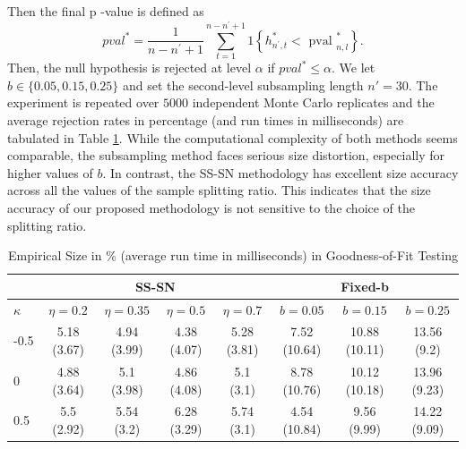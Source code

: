 \documentclass[11pt]{article}
\theoremstyle{plain}
\theoremstyle{definition}
\theoremstyle{remark}
\begin{document}
Then the final p -value is defined as
$$
pval^*=\frac{1}{n-n^{\prime}+1} \sum_{t=1}^{n-n^{\prime}+1} 1\left\{h_{n^{\prime}, t}^*<\text { pval }_{n, l}^*\right\}.
$$
 Then, the null hypothesis is rejected at level $\alpha$ if $pval^*\leq \alpha.$ We let $b\in \{0.05, 0.15, 0.25\}$ and set the second-level subsampling length $n'=30.$ The experiment is repeated over $5000$ independent Monte Carlo replicates and the average rejection rates in percentage (and run times in milliseconds) are tabulated in Table \ref{tab:Size_GOF}. 
While the computational complexity of both methods seems comparable,
the subsampling method faces serious size distortion, especially for higher values of $b$. In contrast, the SS-SN methodology has excellent size accuracy across all the values of the sample splitting ratio. This indicates that the size accuracy of our proposed methodology is not sensitive to the choice of the splitting ratio.\\
\begin{table}
\centering
    \caption{Empirical Size in \% (average run time in milliseconds) in Goodness-of-Fit Testing}
    \label{tab:Size_GOF}
    \begin{tabular}{@{}l|cccc|ccc@{}}
        \hline
     & \multicolumn{4}{c|}{SS-SN} & \multicolumn{3}{c}{Fixed-b}\\
   \hline
        $\kappa$ & $\eta=0.2$ & $\eta=0.35$ & $\eta=0.5$ & $\eta=0.7$ & $b=0.05$ & $b=0.15$ & $b=0.25$\\
        \hline 
       -0.5 & 5.18 (3.67)& 4.94 (3.99)& 4.38 (4.07)& 5.28  (3.81)& 7.52 (10.64)&10.88 (10.11)&13.56 (9.2)\\ 
        0 & 4.88 (3.64)& 5.1 (3.98)& 4.86 (4.08)& 5.1 (3.1)& 8.78 (10.76)& 10.12 (10.18)&13.96 (9.23)\\ 
        0.5 & 5.5 (2.92)&5.54 (3.2)&6.28 (3.29)&5.74 (3.1)&4.54 (10.84)&9.56 (9.99)& 14.22 (9.09)\\ \hline
    \end{tabular}
\end{table}
\end{document}
